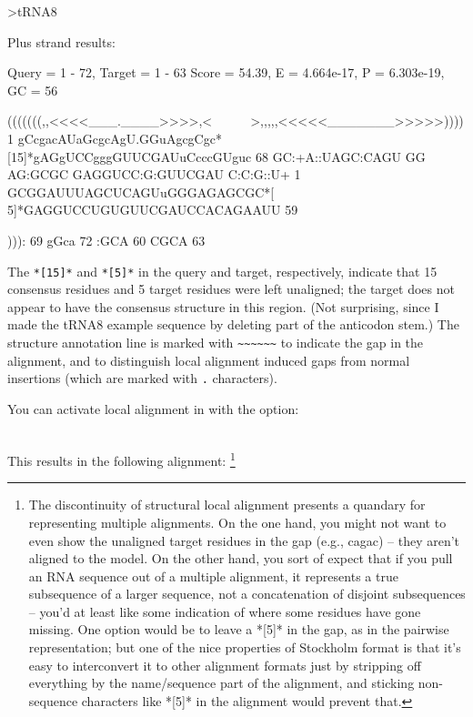 {\samepage
\begin{sreoutput}
>tRNA8

  Plus strand results:

 Query = 1 - 72, Target = 1 - 63
 Score = 54.39, E = 4.664e-17, P = 6.303e-19, GC =  56

           (((((((,,<<<<___.____>>>>,<~~~~~~>,,,,,<<<<<_______>>>>>))))
         1 gCcgacAUaGcgcAgU.GGuAgcgCgc*[15]*gAGgUCCgggGUUCGAUuCcccGUguc 68      
           GC:+A::UAGC:CAGU GG AG:GCGC      GAGGUCC:G:GUUCGAU C:C:G::U+
         1 GCGGAUUUAGCUCAGUuGGGAGAGCGC*[ 5]*GAGGUCCUGUGUUCGAUCCACAGAAUU 59      

           ))):
        69 gGca 72      
           :GCA
        60 CGCA 63      
\end{sreoutput}
}

The \verb+*[15]*+ and \verb+*[5]*+ in the query and target,
respectively, indicate that 15 consensus residues and 5 target
residues were left unaligned; the target does not appear to have the
consensus structure in this region. (Not surprising, since I made the
tRNA8 example sequence by deleting part of the anticodon stem.)  The
structure annotation line is marked with \verb+~~~~~~+ to indicate the
gap in the alignment, and to distinguish local alignment induced gaps
from normal insertions (which are marked with \verb+.+ characters).

You can activate local alignment in  with the 
option:

\\

This results in the following alignment:
\footnote{The discontinuity of structural local alignment presents a
quandary for representing multiple alignments. On the one hand, you
might not want to even show the unaligned target residues in the gap
(e.g., cagac) -- they aren't aligned to the model. On the other hand,
you sort of expect that if you pull an RNA sequence out of a multiple
alignment, it represents a true subsequence of a larger sequence, not
a concatenation of disjoint subsequences -- you'd at least like some
indication of where some residues have gone missing. One option would
be to leave a *[5]* in the gap, as in the pairwise
representation; but one of the nice properties of Stockholm format is
that it's easy to interconvert it to other alignment formats just by
stripping off everything by the name/sequence part of the alignment,
and sticking non-sequence characters like *[5]* in the
alignment would prevent that.}

